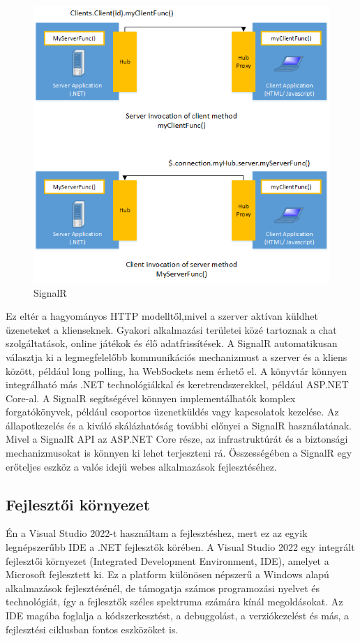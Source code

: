 \begin{figure}[H]
    \centering
    \includegraphics[width=14.0truecm]{images/SignalR.png}
    \caption[SignalR]{SignalR \cite{signalR}}
    \label{fig:signalR}
\end{figure}
Ez eltér a hagyományos HTTP modelltől,mivel a szerver aktívan küldhet üzeneteket a klienseknek.
Gyakori alkalmazási területei közé tartoznak a chat szolgáltatások,
online játékok és élő adatfrissítések. A SignalR automatikusan választja ki a legmegfelelőbb kommunikációs mechanizmust a szerver és a kliens között,
például long polling, ha WebSockets nem érhető el. A könyvtár könnyen integrálható más .NET technológiákkal és keretrendszerekkel, például ASP.NET Core-al.
A SignalR segítségével könnyen implementálhatók komplex forgatókönyvek, például csoportos üzenetküldés vagy kapcsolatok kezelése. Az állapotkezelés és a kiváló skálázhatóság további előnyei a SignalR használatának.
Mivel a SignalR API az ASP.NET Core része, az infrastruktúrát és a biztonsági mechanizmusokat is könnyen ki lehet terjeszteni rá. Összességében a SignalR egy erőteljes eszköz a valós idejű webes alkalmazások fejlesztéséhez.

\subsection{Fejlesztői környezet}
Én a Visual Studio 2022-t \cite[]{vsstudio} használtam a fejlesztéshez, mert ez az egyik legnépszerűbb IDE a .NET fejlesztők körében.
A Visual Studio 2022 egy integrált fejlesztői környezet (Integrated Development Environment, IDE), amelyet a Microsoft fejlesztett ki. Ez a platform különösen népszerű a Windows alapú alkalmazások fejlesztésénél, de támogatja számos programozási nyelvet és technológiát, így a fejlesztők széles spektruma számára kínál megoldásokat. Az IDE magába foglalja a kódszerkesztést, a debuggolást, a verziókezelést és más, a fejlesztési ciklusban fontos eszközöket is.

